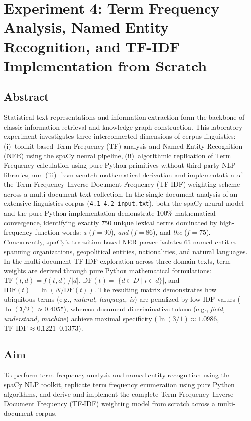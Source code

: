 \chapter{Experiment 4: Term Frequency Analysis, Named Entity Recognition, and TF-IDF Implementation from Scratch}
\label{chap:exp4}

\section{Abstract}
Statistical text representations and information extraction form the backbone of classic information retrieval and knowledge graph construction. This laboratory experiment investigates three interconnected dimensions of corpus linguistics: (i)~toolkit-based Term Frequency (TF) analysis and Named Entity Recognition (NER) using the spaCy neural pipeline, (ii)~algorithmic replication of Term Frequency calculation using pure Python primitives without third-party NLP libraries, and (iii)~from-scratch mathematical derivation and implementation of the Term Frequency--Inverse Document Frequency (TF-IDF) weighting scheme across a multi-document text collection. In the single-document analysis of an extensive linguistics corpus (\texttt{4.1\_4.2\_input.txt}), both the spaCy neural model and the pure Python implementation demonstrate $100\%$ mathematical convergence, identifying exactly 750 unique lexical terms dominated by high-frequency function words: \textit{a} ($f=90$), \textit{and} ($f=86$), and \textit{the} ($f=75$). Concurrently, spaCy's transition-based NER parser isolates 66 named entities spanning organizations, geopolitical entities, nationalities, and natural languages. In the multi-document TF-IDF exploration across three domain texts, term weights are derived through pure Python mathematical formulations: $\text{TF}(t, d) = f(t, d)/|d|$, $\text{DF}(t) = |\{d \in D \mid t \in d\}|$, and $\text{IDF}(t) = \ln(N/\text{DF}(t))$. The resulting matrix demonstrates how ubiquitous terms (e.g., \textit{natural, language, is}) are penalized by low IDF values ($\ln(3/2) \approx 0.4055$), whereas document-discriminative tokens (e.g., \textit{field, understand, machine}) achieve maximal specificity ($\ln(3/1) \approx 1.0986$, $\text{TF-IDF} \approx 0.1221$--$0.1373$).

\section{Aim}
To perform term frequency analysis and named entity recognition using the spaCy NLP toolkit, replicate term frequency enumeration using pure Python algorithms, and derive and implement the complete Term Frequency--Inverse Document Frequency (TF-IDF) weighting model from scratch across a multi-document corpus.

